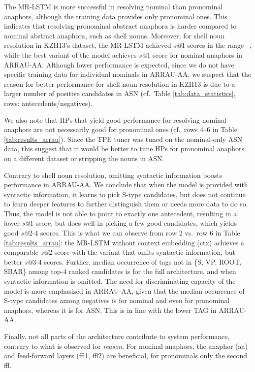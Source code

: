 \documentclass[11pt,letterpaper]{article}
\begin{document}
The MR-LSTM is more successful in resolving nominal than pronominal anaphors, although the training data provides only pronominal ones. This indicates that resolving pronominal
abstract anaphora is harder compared to nominal abstract anaphora, such as shell nouns. Moreover, for shell noun resolution in KZH13's dataset, the MR-LSTM achieved \textit{s@}1 scores in the range --, while the best variant of the model achieves  \textit{s@}1 score for nominal anaphors in ARRAU-AA. Although lower performance is expected, since we do not have specific
training data for individual nominals in ARRAU-AA, we suspect that the reason for better performance for shell noun resolution in KZH13 is due to a larger number of positive candidates in ASN (cf.\ Table \ref{tab:data_statistics}, rows: antecedents/negatives). 

We also note that HPs that yield good performance for resolving nominal anaphors are not necessarily good for pronominal ones (cf.\ rows 4--6 in Table \ref{tab:results_arrau}). Since the TPE tuner was tuned on the nominal-only ASN data, this suggest that it would be better to tune HPs for pronominal anaphors on a different dataset or stripping the nouns in ASN. 

Contrary to shell noun resolution, omitting syntactic information boosts performance in ARRAU-AA. We conclude that when the model is provided with syntactic information, it learns to pick S-type candidates, but does not continue to learn deeper features to further distinguish them or needs more data to do so. Thus,
the model is not able to point to exactly one antecedent, resulting  in a lower \textit{s@}1 score, but does well in picking a few good candidates, which yields good \textit{s@}2-4 scores. This is what we can observe
from row 2 vs.\ row 6 in Table \ref{tab:results_arrau}: 
the MR-LSTM without context embedding (ctx) achieves a comparable \textit{s@}2 score with the variant that omits syntactic information, but better \textit{s@}3-4 scores. Further, median occurrence of tags not in \{S, VP, ROOT, SBAR\} among top-4 ranked candidates is  for the full architecture, and  when syntactic information is omitted. The need for discriminating capacity
of the model is more emphasized in ARRAU-AA, given that the median occurrence of S-type candidates among negatives is  for nominal and even  for pronominal anaphors, whereas it is  for ASN.
This is in line with the lower TAG in ARRAU-AA. 

Finally, not all parts of the architecture contribute to system performance,
contrary to what is observed for
\textit{reason}. For nominal anaphors, 
the anaphor (aa) and feed-forward layers (ffl1, ffl2) are beneficial, for pronominals only the second
ffl.
\end{document}
